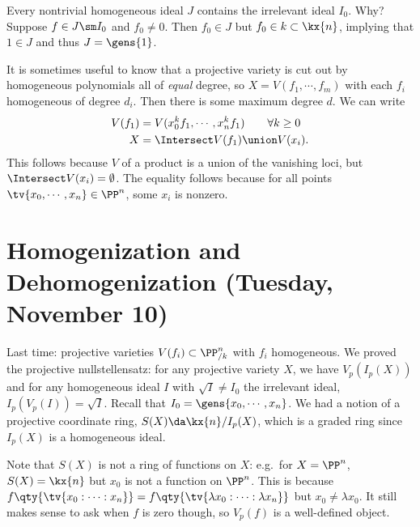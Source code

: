 \begin{remark}

Every nontrivial homogeneous ideal \(J\) contains the irrelevant ideal
\(I_0\). Why? Suppose \(f\in J\sm I_0\) and \(f_0\neq 0\). Then
\(f_0\in J\) but \(f_0\in k\subset \kx{n}\), implying that \(1\in J\)
and thus \(J = \gens{1}\).

\end{remark}


\begin{remark}

It is sometimes useful to know that a projective variety is cut out by
homogeneous polynomials all of \emph{equal} degree, so
\(X = V (f_1, \cdots, f_m)\) with each \(f_i\) homogeneous of degree
\(d_i\). Then there is some maximum degree \(d\). We can write
\begin{align*}  
V(f_1) &= V(x_0^k f_1, \cdots, x_n^k f_1 ) \qquad \forall k\geq 0 \\
X &= \Intersect V(f_1) \union V(x_i)
.\end{align*} This follows because \(V\) of a product is a union of the
vanishing loci, but \(\Intersect V(x_i) = \emptyset\). The equality
follows because for all points \(\tv{x_0, \cdots, x_n} \in \PP^n\), some
\(x_i\) is nonzero.

\end{remark}

\hypertarget{homogenization-and-dehomogenization-tuesday-november-10}{%
\section{Homogenization and Dehomogenization (Tuesday, November
10)}\label{homogenization-and-dehomogenization-tuesday-november-10}}

Last time: projective varieties \(V(f_i) \subset \PP^n_{/k}\) with
\(f_i\) homogeneous. We proved the projective nullstellensatz: for any
projective variety \(X\), we have \(V_p(I_p(X))\) and for any
homogeneous ideal \(I\) with \(\sqrt{I} \neq I_0\) the irrelevant ideal,
\(I_p(V_p(I)) = \sqrt{I}\). Recall that
\(I_0 = \gens{x_0, \cdots, x_n}\). We had a notion of a projective
coordinate ring, \(S(X) \da \kx{n} / I_p(X)\), which is a graded ring
since \(I_p(X)\) is a homogeneous ideal.

\begin{remark}

Note that \(S(X)\) is not a ring of functions on \(X\): e.g.~for
\(X= \PP^n\), \(S(X) = \kx{n}\) but \(x_0\) is not a function on
\(\PP^n\). This is because
\(f\qty{\tv{x_0: \cdots : x_n}} = f\qty{\tv{\lambda x_0: \cdots : \lambda x_n}}\)
but \(x_0\neq \lambda x_0\). It still makes sense to ask when \(f\) is
zero though, so \(V_p(f)\) is a well-defined object.

\end{remark}

